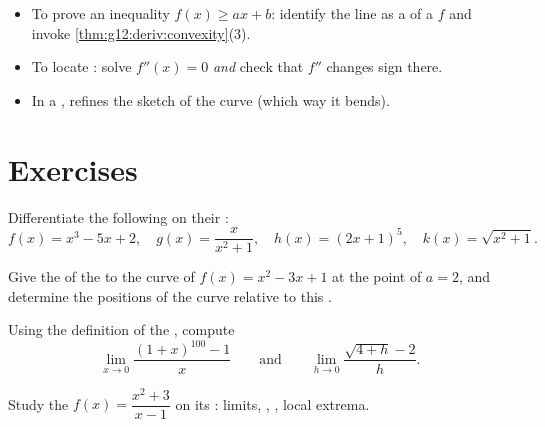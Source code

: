 \begin{method}\label{met:g12:deriv:convexity}
\begin{itemize}
  \item To prove an inequality $f(x) \geq ax + b$: identify the line as a
         of a  $f$ and invoke
        \cref{thm:g12:deriv:convexity}(3).
  \item To locate : solve $f''(x) = 0$ \emph{and} check
        that $f''$ changes sign there.
  \item In a ,  refines the sketch of the curve
        (which way it bends).
\end{itemize}
\end{method}

\section{Exercises}

\begin{exercise}[$\star$]\label{exo:g12:deriv:1}
Differentiate the following  on their :
\[
f(x) = x^3 - 5x + 2, \quad
g(x) = \frac{x}{x^2+1}, \quad
h(x) = (2x+1)^5, \quad
k(x) = \sqrt{x^2 + 1}.
\]
\end{exercise}

\begin{exercise}[$\star$]\label{exo:g12:deriv:2}
Give the  of the  to the curve of $f(x) = x^2 - 3x + 1$ at
the point of  $a = 2$, and determine the positions of the curve
relative to this .
\end{exercise}

\begin{exercise}[$\star$]\label{exo:g12:deriv:3}
Using the definition of the , compute
\[
\lim_{x \to 0} \frac{(1+x)^{100} - 1}{x}
\qquad\text{and}\qquad
\lim_{h \to 0} \frac{\sqrt{4+h} - 2}{h}.
\]
\end{exercise}

\begin{exercise}[$\star\star$]\label{exo:g12:deriv:4}
Study the  $f(x) = \dfrac{x^2 + 3}{x - 1}$ on its : limits,
, , local extrema.
\end{exercise}

